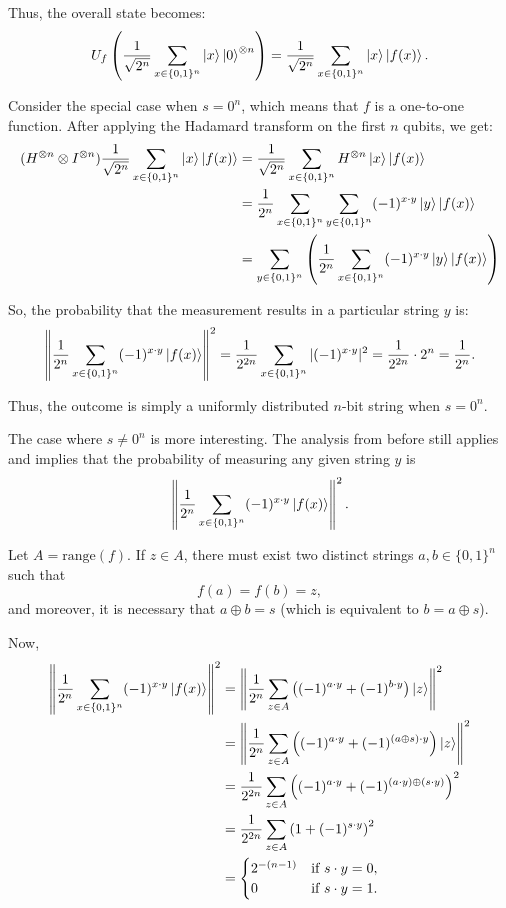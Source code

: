 Thus, the overall state becomes:
\[
U_f\left( \frac{1}{\sqrt{2^n}} \sum_{x \in \{0,1\}^n} \ket{x}\ket{0}^{\otimes n} \right) = \frac{1}{\sqrt{2^n}} \sum_{x \in \{0,1\}^n} \ket{x}\ket{f(x)}.
\]

Consider the special case when $s = 0^n$, which means that $f$ is a one-to-one function. After applying the Hadamard transform on the first $n$ qubits, we get:
\begin{align*}
(H^{\otimes n} \otimes I^{\otimes n}) \frac{1}{\sqrt{2^n}} \sum_{x \in \{0,1\}^n} \ket{x} \ket{f(x)} 
&= \frac{1}{\sqrt{2^n}} \sum_{x \in \{0,1\}^n} H^{\otimes n} \ket{x} \ket{f(x)} \\
&= \frac{1}{2^n} \sum_{x \in \{0,1\}^n} \sum_{y \in \{0,1\}^n} (-1)^{x \cdot y} \ket{y} \ket{f(x)} \\
&= \sum_{y \in \{0,1\}^n} \left( \frac{1}{2^n} \sum_{x \in \{0,1\}^n} (-1)^{x \cdot y} \ket{y}\ket{f(x)} \right)
\end{align*}

So, the probability that the measurement results in a particular string $y$ is:
\[
\left\| \frac{1}{2^n} \sum_{x \in \{0,1\}^n} (-1)^{x \cdot y} \ket{f(x)} \right\|^2 
= \frac{1}{2^{2n}} \sum_{x \in \{0,1\}^n} |(-1)^{x \cdot y}|^2 
= \frac{1}{2^{2n}} \cdot 2^n = \frac{1}{2^n}.
\]

Thus, the outcome is simply a uniformly distributed $n$-bit string when $s = 0^n$.

The case where $s \neq 0^n$ is more interesting. The analysis from before still applies and implies that the probability of measuring any given string $y$ is
\[
\left\| \frac{1}{2^n} \sum_{x \in \{0,1\}^n} (-1)^{x \cdot y} \ket{f(x)} \right\|^2.
\]

Let $A = \text{range}(f)$. If $z \in A$, there must exist two distinct strings $a, b \in \{0,1\}^n$ such that
\[
f(a) = f(b) = z,
\]
and moreover, it is necessary that $a \oplus b = s$ (which is equivalent to $b = a \oplus s$).

Now,
\begin{align*}
\left\| \frac{1}{2^n} \sum_{x \in \{0,1\}^n} (-1)^{x \cdot y} \ket{f(x)} \right\|^2
&= \left\| \frac{1}{2^n} \sum_{z \in A} \left( (-1)^{a \cdot y} + (-1)^{b \cdot y} \right) \ket{z} \right\|^2 \\
&= \left\| \frac{1}{2^n} \sum_{z \in A} \left( (-1)^{a \cdot y} + (-1)^{(a \oplus s) \cdot y} \right) \ket{z} \right\|^2 \\
&= \frac{1}{2^{2n}} \sum_{z \in A} \left( (-1)^{a \cdot y} + (-1)^{(a \cdot y) \oplus (s \cdot y)} \right)^2 \\
&= \frac{1}{2^{2n}} \sum_{z \in A} \left(1 + (-1)^{s \cdot y} \right)^2 \\
&= \begin{cases}
    2^{-(n-1)} & \text{if } s \cdot y = 0, \\
    0 & \text{if } s \cdot y = 1.
\end{cases}
\end{align*}

